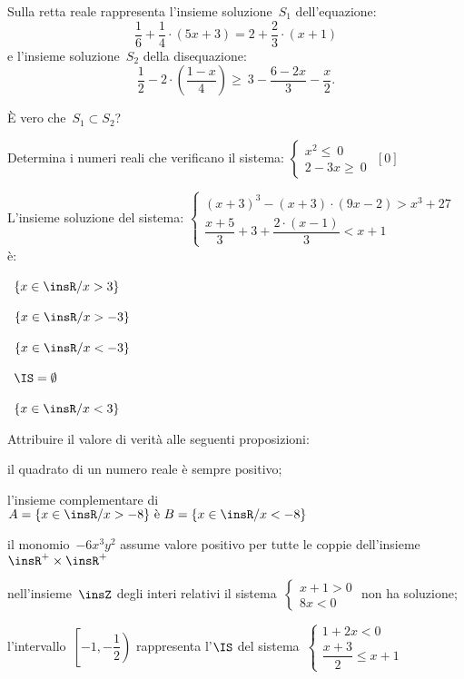 \begin{esercizio}
 \label{ese:21.33}
Sulla retta reale rappresenta l'insieme soluzione~$S_{1}$
dell'equazione:
\[\frac{1}{6}+\frac{1}{4}\cdot (5x+3)=2+\frac{2}{3}\cdot (x+1)\]
e l'insieme soluzione~$S_{2}$ della disequazione:
\[\frac{1}{2}-2\cdot\left(\frac{1-x}{4}\right)\ge
~3-\frac{6-2x}{3}-\frac{x}{2}.\]

È vero che~$S_{1}\subset S_{2}$?
\end{esercizio}

\begin{esercizio}[\Ast]
 \label{ese:21.34}
 Determina i numeri reali che verificano il sistema:
 $\left\{%
  \begin{array}{l}
  x^{2}\le~0
  \\2-3x\ge~0
 \end{array}\right.$
 \hfill $\left[0\right]$
 \end{esercizio}

\begin{esercizio}
 \label{ese:21.35}
 L'insieme soluzione del sistema:
$\left\{\begin{array}{l}
  (x+3)^{3}-(x+3)\cdot (9x-2)>x^{3}+27\\
  \dfrac{x+5}{3}+3+\dfrac{2\cdot (x-1)}{3}<x+1
 \end{array}\right.$ è:
\begin{multicols}{2}
\boxA\quad~$\left\{x\in \insR/x>3\right\}$

\boxB\quad~$\left\{x\in \insR/x>-3\right\}$

\boxC\quad~$\left\{x\in \insR/x<-3\right\}$

\boxD\quad~$\IS=\emptyset $

\boxE\quad~$\left\{x\in\insR/x<3\right\}$
\end{multicols}

\end{esercizio}

\begin{esercizio}
 \label{ese:21.36}
 Attribuire il valore di verità alle seguenti proposizioni:

\begin{enumeratea}
\item il quadrato di un numero reale è sempre positivo;
\item l'insieme complementare di~$A=\{x\in\insR/x>-8\}\text{ è 
}B=\{x\in\insR/x<-8\}$
\item il monomio~$-6x^{3}y^{2}$ assume valore positivo per tutte le coppie 
dell'insieme~$\insR^{+}\times\insR^{+}$
\item nell'insieme~$\insZ$ degli interi relativi il 
sistema~$\left\{\begin{array}{l}x+1>0\\8x<0\end{array}\right.$ non ha soluzione;
\item l'intervallo~$\left[-1,\left.-{\dfrac{1}{2}}\right)\right.$ rappresenta 
l'$\IS$ del sistema~$\left\{\begin{array}{l}1+2x<0 \\\dfrac{x+3}{2}\le 
x+1\end{array}\right.$
\end{enumeratea}
\end{esercizio}

